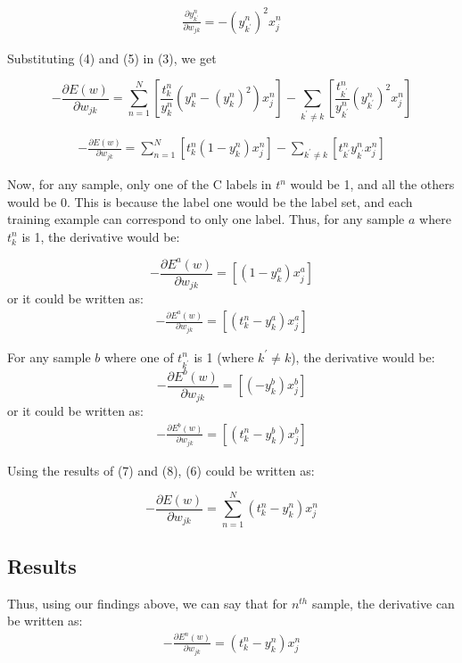 \documentclass{article}
\begin{document}
\begin{align}
\frac{\partial y_{k^{'}}^{n}}{\partial w_{jk}} = - \left(y_{k^{'}}^{n}\right)^{2} x^{n}_{j}
\end{align}

Substituting (4) and (5) in (3), we get

$$- \frac{\partial E(w)}{\partial w_{jk}} = \sum_{n=1}^{N} \left[ \frac{t_{k}^{n}}{y_{k}^{n}} \left(y_{k}^{n} - (y_{k}^{n})^{2}\right) x^{n}_{j} \right] - \sum_{k^{'}\neq k} \left[ \frac{t_{k^{'}}^{n}}{y_{k^{'}}^{n}} \left(y_{k^{'}}^{n}\right)^{2} x^{n}_{j} \right]$$

\begin{align}
- \frac{\partial E(w)}{\partial w_{jk}} = \sum_{n=1}^{N} \left[ t_{k}^{n}\left(1 - y_{k}^{n}\right) x^{n}_{j} \right] - \sum_{k^{'}\neq k} \left[ t_{k^{'}}^{n} y_{k^{'}}^{n} x^{n}_{j} \right]
\end{align}

Now, for any sample, only one of the C labels in $t^{n}$ would be 1, and all the others would be 0. This is because the label one would be the label set, and each training example can correspond to only one label.
Thus, for any sample $a$ where $t^{n}_{k}$ is 1, the derivative would be:

$$- \frac{\partial E^{a}(w)}{\partial w_{jk}} = \left[ \left(1 - y_{k}^{a}\right) x^{a}_{j} \right]$$
or it could be written as:
\begin{align}
- \frac{\partial E^{a}(w)}{\partial w_{jk}} = \left[ \left(t^{n}_{k} - y_{k}^{a}\right) x^{a}_{j} \right]
\end{align}

For any sample $b$ where one of $t^{n}_{k^{'}}$ is 1 (where $k^{'} \neq k$), the derivative would be:
$$- \frac{\partial E^{b}(w)}{\partial w_{jk}} = \left[ \left(- y_{k}^{b}\right) x^{b}_{j} \right]$$ 
or it could be written as:
\begin{align}
- \frac{\partial E^{b}(w)}{\partial w_{jk}} = \left[ \left(t^{n}_{k} - y_{k}^{b}\right) x^{b}_{j} \right]
\end{align}

Using the results of (7) and (8), (6) could be written as:

$$- \frac{\partial E(w)}{\partial w_{jk}} = \sum_{n=1}^{N} \left( t_{k}^{n} - y_{k}^{n}\right) x^{n}_{j}$$

\subsection{Results}
Thus, using our findings above, we can say that for $n^{th}$ sample, the derivative can be written as:
\begin{align}
- \frac{\partial E^{n}(w)}{\partial w_{jk}} = \left( t_{k}^{n} - y_{k}^{n}\right) x^{n}_{j}
\end{align}
\end{document}
